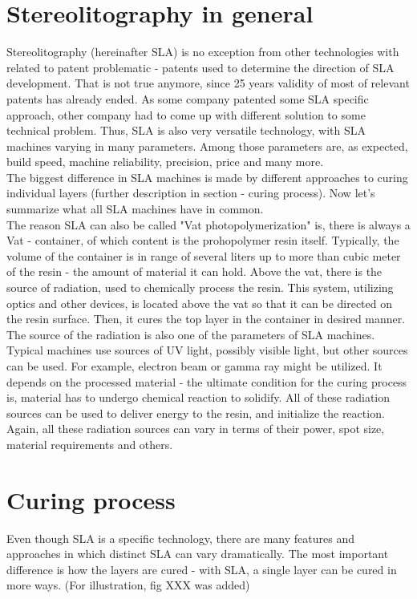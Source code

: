\documentclass[a4paper, twoside, 11pt]{report}
\begin{document}
\section{Stereolitography in general}
Stereolitography (hereinafter SLA) is no exception from other technologies with related to patent problematic - patents used to determine the direction of SLA development. That is not true anymore, since 25 years validity of most of relevant patents has already ended. As some company patented some SLA specific approach, other company had to come up with different solution to some technical problem. Thus, SLA is also very versatile technology, with SLA machines varying in many parameters. Among those parameters are, as expected, build speed, machine reliability, precision, price and many more.\\
The biggest difference in SLA machines is made by different approaches to curing individual layers (further description in section - curing process). Now let's summarize what all SLA machines have in common.
\\The reason SLA can also be called "Vat photopolymerization" is, there is always a Vat - container, of which content is the prohopolymer resin itself. Typically, the volume of the container is in range of several liters up to more than cubic meter of the resin - the amount of material it can hold. Above the vat, there is the source of radiation, used to chemically process the resin. This system, utilizing optics and other devices, is located above the vat so that it can be directed on the resin surface. Then, it cures the top layer in the container in desired manner.\\
The source of the radiation is also one of the parameters of SLA machines. Typical machines use sources of UV light, possibly visible light, but other sources can be used. For example, electron beam or gamma ray might be utilized. It depends on the processed material - the ultimate condition for the curing process is, material has to undergo chemical reaction to solidify. All of these radiation sources can be used to deliver energy to the resin, and initialize the reaction. Again, all these radiation sources can vary in terms of their power, spot size, material requirements and others.
\section{Curing process} 
Even though SLA is a specific technology, there are many features and approaches in which distinct  SLA can vary dramatically. The most important difference is how the layers are cured - with SLA, a single layer can be cured in more ways. (For illustration, fig XXX was added)
\end{document}
